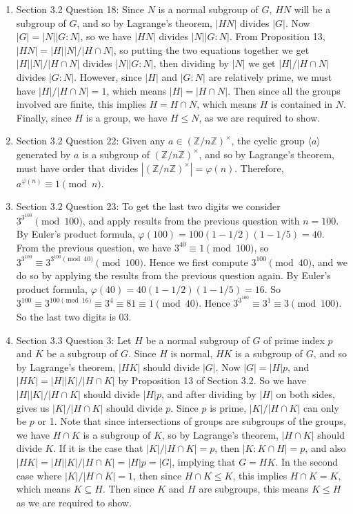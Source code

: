 \documentclass{article}
\begin{document}
\begin{enumerate}
  \item Section 3.2 Question 18: Since $N$ is a normal subgroup of $G$,
    $HN$ will be a subgroup of $G$, and so by Lagrange's theorem, $|HN|$
    divides $|G|$. Now $|G|=|N||G:N|$, so we have $|HN|$ divides
    $|N||G:N|$. From Proposition 13, $|HN|=|H||N|/|H\cap N|$, so putting
    the two equations together we get $|H||N|/|H\cap N|$ divides
    $|N||G:N|$, then dividing by $|N|$ we get $|H|/|H\cap N|$ divides
    $|G:N|$. However, since $|H|$ and $|G:N|$ are relatively prime, we must
    have $|H|/|H\cap N|=1$, which means $|H|=|H\cap N|$. Then since all the
    groups involved are finite, this implies $H=H\cap N$, which means $H$
    is contained in $N$. Finally, since $H$ is a group, we have $H\leq N$,
    as we are required to show.

  \item Section 3.2 Question 22: Given any
    $a\in(\mathbb{Z}/n\mathbb{Z})^\times$, the cyclic group $\langle
    a\rangle$ generated by $a$ is a subgroup of
    $(\mathbb{Z}/n\mathbb{Z})^\times$, and so by Lagrange's theorem, must
    have order that divides $|(\mathbb{Z}/n\mathbb{Z})^\times|=\varphi(n)$.
    Therefore, $a^{\varphi(n)}\equiv 1\pmod{n}$.

  \item Section 3.2 Question 23: To get the last two digits we consider
    $3^{3^{100}}\pmod{100}$, and apply results from the previous question
    with $n=100$. By Euler's product formula,
    $\varphi(100)=100(1-1/2)(1-1/5)=40$. From the previous question, we
    have $3^{40}\equiv1\pmod{100}$, so
    $3^{3^{100}}\equiv3^{3^{100}\pmod{40}}\pmod{100}$. Hence we first
    compute $3^{100}\pmod{40}$, and we do so by applying the results from
    the previous question again. By Euler's product formula,
    $\varphi(40)=40(1-1/2)(1-1/5)=16$. So
    $3^{100}\equiv3^{100\pmod{16}}\equiv3^4\equiv81\equiv1\pmod{40}$. Hence
    $3^{3^{100}}\equiv3^{1}\equiv3\pmod{100}$. So the last two digits is
    03.

  \item Section 3.3 Question 3: Let $H$ be a normal subgroup of $G$ of
    prime index $p$ and $K$ be a subgroup of $G$. Since $H$ is normal, $HK$
    is a subgroup of $G$, and so by Lagrange's theorem, $|HK|$ should
    divide $|G|$. Now $|G|=|H|p$, and
    $|HK|=|H||K|/|H\cap K|$ by Proposition 13 of Section 3.2. So we have
    $|H||K|/|H\cap K|$ should divide $|H|p$, and after dividing by $|H|$ on
    both sides, gives us $|K|/|H\cap K|$ should divide $p$. Since $p$ is
    prime, $|K|/|H\cap K|$ can only be $p$ or 1. Note that since
    intersections of groups are subgroups of the groups, we have $H\cap K$
    is a subgroup of $K$, so by Lagrange's theorem, $|H\cap K|$ should
    divide $K$. If it is the case that $|K|/|H\cap K|=p$, then $|K:K\cap
    H|=p$, and also $|HK|=|H||K|/|H\cap K|=|H|p=|G|$, implying that $G=HK$.
    In the second case where $|K|/|H\cap K|=1$, then since $H\cap K\leq K$,
    this implies $H\cap K=K$, which means $K\subseteq H$. Then since $K$
    and $H$ are subgroups, this means $K\leq H$ as we are required to show.


\end{enumerate}
\end{document}
